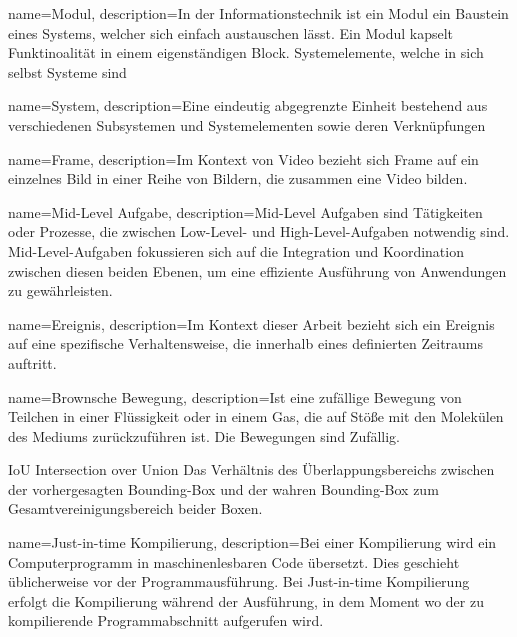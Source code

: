 
{
        name=Modul,
        description={In der Informationstechnik ist ein Modul ein Baustein eines Systems, welcher sich einfach austauschen lässt. Ein Modul kapselt Funktinoalität in einem eigenständigen Block. Systemelemente, welche in sich selbst Systeme sind}
}

{
        name=System,
        description={Eine eindeutig abgegrenzte Einheit bestehend aus verschiedenen Subsystemen und Systemelementen sowie deren Verknüpfungen}
}

{
        name=Frame,
        description={Im Kontext von Video bezieht sich Frame auf ein einzelnes Bild in einer Reihe von Bildern, die zusammen eine Video bilden.}
}

{
        name=Mid-Level Aufgabe,
        description={Mid-Level Aufgaben sind Tätigkeiten oder Prozesse, die zwischen Low-Level- und High-Level-Aufgaben notwendig sind. Mid-Level-Aufgaben fokussieren sich auf die Integration und Koordination zwischen diesen beiden Ebenen, um eine effiziente Ausführung von Anwendungen zu gewährleisten.}
}

{
        name=Ereignis,
        description={Im Kontext dieser Arbeit bezieht sich ein Ereignis auf eine spezifische Verhaltensweise, die innerhalb eines definierten Zeitraums auftritt.}
}

{
        name=Brownsche Bewegung,
        description={Ist eine zufällige Bewegung von Teilchen in einer Flüssigkeit oder in einem Gas, die auf Stöße mit den Molekülen des Mediums zurückzuführen ist. Die Bewegungen sind Zufällig.}
}

\newglossaryentrywithacronym
{IoU}
{Intersection over Union}
{Das Verhältnis des Überlappungsbereichs zwischen der vorhergesagten Bounding-Box und der wahren Bounding-Box zum Gesamtvereinigungsbereich beider Boxen.}

{
        name=Just-in-time Kompilierung,
        description={Bei einer Kompilierung wird ein Computerprogramm in maschinenlesbaren Code übersetzt. Dies geschieht üblicherweise vor der Programmausführung. Bei Just-in-time Kompilierung erfolgt die Kompilierung während der Ausführung, in dem Moment wo der zu kompilierende Programmabschnitt aufgerufen wird.}
}

